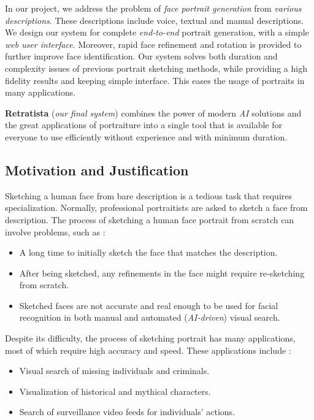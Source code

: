 In our project, we address the problem of \emph{face portrait generation} from \emph{various descriptions}. These descriptions include voice, textual and manual descriptions. We design our system for complete \emph{end-to-end} portrait generation, with a simple \emph{web user interface}. Moreover, rapid face refinement and rotation is provided to further improve face identification. Our system solves both duration and complexity issues of previous portrait sketching methods, while providing a high fidelity results and keeping simple interface. This eases the usage of portraits in many applications.

\textbf{Retratista} (\emph{our final system}) combines the power of modern \emph{AI} solutions and the great applications of portraiture into a single tool that is available for everyone to use efficiently without experience and with minimum duration. 

\subsection{Motivation and Justification}
Sketching a human face from bare description is a tedious task that requires specialization. Normally, professional portraitists are asked to sketch a face from description. The process of sketching a human face portrait from scratch can involve problems, such as :
\begin{itemize}
    \item A long time to initially sketch the face that matches the description.
    \item After being sketched, any refinements in the face might require re-sketching from scratch.
    \item Sketched faces are not accurate and real enough to be used for facial recognition in both manual and automated (\emph{AI-driven}) visual search.
\end{itemize}

Despite its difficulty, the process of sketching portrait has many applications, most of which require high accuracy and speed. These applications include :
\begin{itemize}
    \item Visual search of missing individuals and criminals.
    \item Visualization of historical and mythical characters.
    \item Search of surveillance video feeds for individuals' actions.
\end{itemize}

